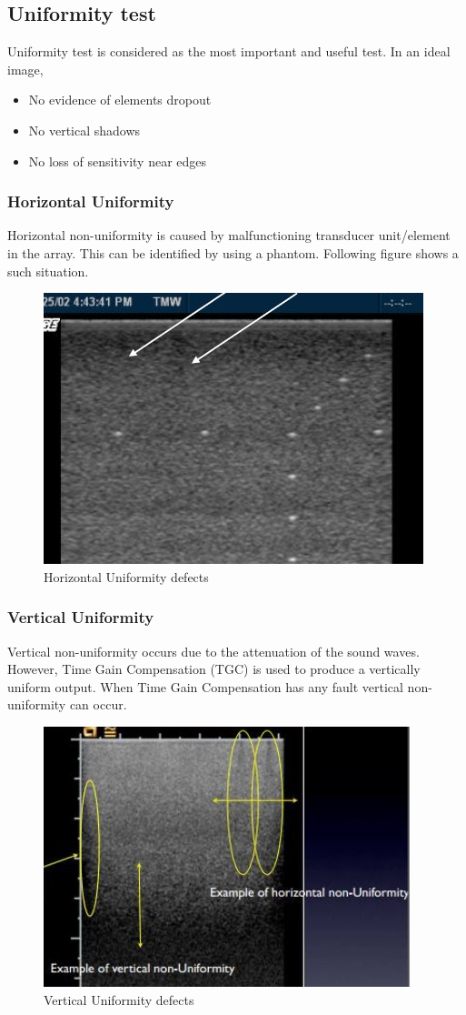 \documentclass[12pt]{article}
\begin{document}
\subsection{Uniformity test}
Uniformity test is considered as the most important and useful test. In an ideal image,
\begin{itemize}
    \item No evidence of elements dropout
    \item No vertical shadows
    \item No loss of sensitivity near edges
\end{itemize}
\subsubsection{Horizontal Uniformity}
Horizontal non-uniformity is caused by malfunctioning transducer unit/element in the array. This can be identified by using a phantom. Following figure shows a such situation. 
\begin{figure}[!h]
    \centering
    \includegraphics[width=0.6\linewidth]{un.jpg}
    \caption{\small{Horizontal Uniformity defects}}
    \label{fig:Horizontal Uniformity defects}
\end{figure}
\subsubsection{Vertical Uniformity}
Vertical non-uniformity occurs due to the attenuation of the sound waves. However, Time Gain Compensation (TGC) is used to produce a vertically uniform output. When Time Gain Compensation has any fault vertical non-uniformity can occur. 
\begin{figure}[!h]
    \centering
    \includegraphics[width=0.6\linewidth]{vu.jpg}
    \caption{\small{Vertical Uniformity defects}}
    \label{fig:Vertical Uniformity defects}
\end{figure}
\end{document}

